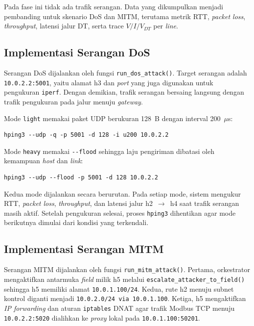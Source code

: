 Pada fase ini tidak ada trafik serangan. Data yang dikumpulkan menjadi pembanding untuk skenario \ac{DoS} dan \ac{MITM}, terutama metrik \ac{RTT}, \textit{packet loss}, \textit{throughput}, latensi jalur \ac{DT}, serta trace $V/I/V_{DT}$ per \textit{line}.

\subsection{Implementasi Serangan DoS}
\label{subsec:implementasi_serangan_dos}
Serangan \ac{DoS} dijalankan oleh fungsi \texttt{run\_dos\_attack()}. Target serangan adalah \texttt{10.0.2.2:5001}, yaitu alamat h3 dan \textit{port} yang juga digunakan untuk pengukuran \texttt{iperf}. Dengan demikian, trafik serangan bersaing langsung dengan trafik pengukuran pada jalur menuju \textit{gateway}.

Mode \texttt{light} memakai paket UDP berukuran 128~B dengan interval 200~$\mu$s:
\begin{verbatim}
hping3 --udp -q -p 5001 -d 128 -i u200 10.0.2.2
\end{verbatim}

Mode \texttt{heavy} memakai \texttt{-{}-flood} sehingga laju pengiriman dibatasi oleh kemampuan \textit{host} dan \textit{link}:
\begin{verbatim}
hping3 --udp --flood -p 5001 -d 128 10.0.2.2
\end{verbatim}

Kedua mode dijalankan secara berurutan. Pada setiap mode, sistem mengukur \ac{RTT}, \textit{packet loss}, \textit{throughput}, dan latensi jalur h2~$\rightarrow$~h4 saat trafik serangan masih aktif. Setelah pengukuran selesai, proses \texttt{hping3} dihentikan agar mode berikutnya dimulai dari kondisi yang terkendali.

\subsection{Implementasi Serangan MITM}
\label{subsec:implementasi_serangan_mitm}
Serangan \ac{MITM} dijalankan oleh fungsi \texttt{run\_mitm\_attack()}. Pertama, orkestrator mengaktifkan antarmuka \textit{field} milik h5 melalui \texttt{escalate\_attacker\_to\_field()} sehingga h5 memiliki alamat \texttt{10.0.1.100/24}. Kedua, rute h2 menuju subnet kontrol diganti menjadi \texttt{10.0.2.0/24 via 10.0.1.100}. Ketiga, h5 mengaktifkan \textit{IP forwarding} dan aturan \texttt{iptables} \ac{DNAT} agar trafik Modbus TCP menuju \texttt{10.0.2.2:5020} dialihkan ke \textit{proxy} lokal pada \texttt{10.0.1.100:50201}.

